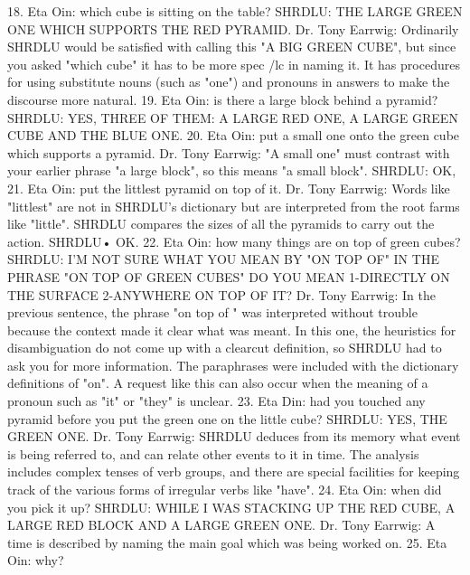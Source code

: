 {18. Eta Oin: which cube is sitting on the table?
        SHRDLU: THE LARGE GREEN ONE WHICH SUPPORTS THE RED
        PYRAMID.
        Dr. Tony Earrwig: Ordinarily SHRDLU would be satisfied with calling this "A
        BIG GREEN CUBE", but since you asked "which cube" it has to be more spec /lc
        in naming it. It has procedures for using substitute nouns (such as "one") and
        pronouns in answers to make the discourse more natural.
19. Eta Oin: is there a large block behind a pyramid?
        SHRDLU: YES, THREE OF THEM: A LARGE RED ONE, A LARGE GREEN
        CUBE AND THE BLUE ONE.
20. Eta Oin: put a small one onto the green cube which supports a pyramid.
        Dr. Tony Earrwig: "A small one" must contrast with your earlier phrase "a large
        block", so this means "a small block". SHRDLU: OK,
21. Eta Oin: put the littlest pyramid on top of it.
        Dr. Tony Earrwig: Words like "littlest" are not in SHRDLU's dictionary but are
        interpreted from the root farms like "little". SHRDLU compares the sizes of all
        the pyramids to carry out the action.
        SHRDLU• OK.
22. Eta Oin: how many things are on top of green cubes?
        SHRDLU: I'M NOT SURE WHAT YOU MEAN BY "ON TOP OF" IN THE
        PHRASE "ON TOP OF GREEN CUBES"
        DO YOU MEAN
        1-DIRECTLY ON THE SURFACE
        2-ANYWHERE ON TOP OF IT?
        Dr. Tony Earrwig: In the previous sentence, the phrase "on top of " was
        interpreted without trouble because the context made it clear what was meant. In
           this one, the heuristics for disambiguation do not come up with a clearcut
           definition, so SHRDLU had to ask you for more information. The paraphrases
           were included with the dictionary definitions of "on". A request like this can
           also occur when the meaning of a pronoun such as "it" or "they" is unclear.
23. Eta Din: had you touched any pyramid before you put the green one on the little
        cube?
        SHRDLU: YES, THE GREEN ONE.
        Dr. Tony Earrwig: SHRDLU deduces from its memory what event is being
            referred to, and can relate other events to it in time. The analysis includes
            complex tenses of verb groups, and there are special facilities for keeping
            track of the various forms of irregular verbs like "have".
24. Eta Oin: when did you pick it up?
        SHRDLU: WHILE I WAS STACKING UP THE RED CUBE, A LARGE RED
        BLOCK AND A LARGE GREEN ONE.
        Dr. Tony Earrwig: A time is described by naming the main goal which was being
        worked on.
25. Eta Oin: why?




}
